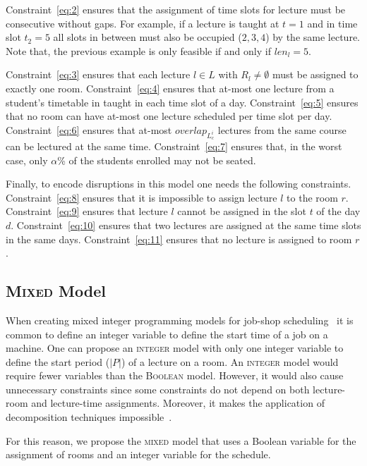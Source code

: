 \documentclass[twocolumn,natbib]{svjour3}          %
\newcounter{constraint}
\begin{document}
Constraint~\ref{eq:2} ensures that the assignment of time slots for lecture must be consecutive without gaps. For example, if a lecture is taught at $t=1$ and in time slot $t_2=5$ all slots in between must also be occupied ($2,3,4$) by the same lecture. Note that, the previous example is only feasible if and only if $len_l=5$.

Constraint~\ref{eq:3} ensures that each lecture $l \in L$ with $R_l \neq \emptyset$ must be assigned to exactly one room. Constraint~\ref{eq:4} ensures that at-most one lecture from a student's timetable in taught in each time slot of a day. Constraint~\ref{eq:5} ensures that no room can have at-most one lecture scheduled per time slot per day. Constraint~\ref{eq:6} ensures that at-most $overlap_{L_c^{i}}$ lectures from the same course can be lectured at the same time. Constraint~\ref{eq:7} ensures that, in the worst case, only $\alpha$\% of the students enrolled may not be seated. 

Finally, to encode disruptions in this model one needs the following constraints.  Constraint~\ref{eq:8} ensures that it is impossible to assign lecture $l$ to the room $r$. Constraint~\ref{eq:9} ensures that lecture $l$ cannot be assigned in the slot $t$ of the day $d$. Constraint~\ref{eq:10} ensures that two lectures are assigned at the same time slots in the same days. Constraint~\ref{eq:11} ensures that no lecture is assigned to room $r$. 


\subsection{\textsc{Mixed} Model}

When creating mixed integer programming models for job-shop scheduling~\citep{DBLP:journals/cor/KuB16} it is common to define an integer variable to define the start time of a job on a machine. One can propose an \textsc{integer} model with only one integer variable to define the start period ($|P|$) of a lecture on a room. An \textsc{integer} model would require fewer variables than the \textsc{Boolean} model. However, it would also cause unnecessary constraints since some constraints do not depend on both lecture-room and lecture-time assignments. Moreover, it makes the application of decomposition techniques impossible~\citep{DBLP:conf/wea/LachL08}.

For this reason, we propose the \textsc{mixed} model that uses a Boolean variable for the assignment of rooms and an integer variable for the schedule.
\end{document}
